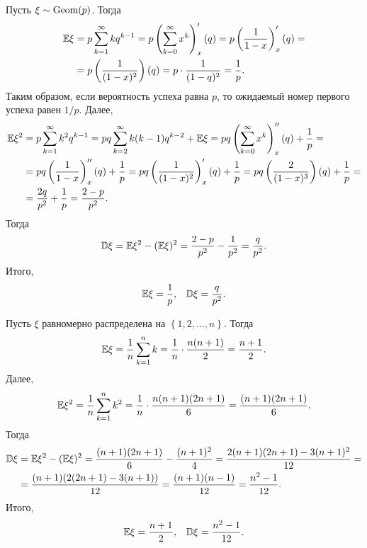 \documentclass[../main.tex]{subfiles}
\begin{document}
   \begin{exmpl}
    Пусть $ \xi\sim\mathrm{Geom}(p) $. Тогда
    \begin{align*}
     \mathbb E\xi &= p \sum_{k=1}^{\infty} k q^{k - 1} = p \left( \sum_{k=0}^{\infty} x^{k} \right)'_x(q) = p \left( \frac{1}{1-x} \right)'_x(q) = \\
     &= p \left( \frac{1}{(1-x)^{2}} \right)(q) = p \cdot \frac{1}{(1-q)^{2}} = \frac{1}{p}.
    \end{align*} Таким образом, если вероятность успеха равна $ p $, то ожидаемый номер первого успеха равен $ 1 / p $. Далее,
    \begin{align*}
     \mathbb E\xi^{2} &= p \sum_{k=1}^{\infty}k^{2}q^{k-1} = pq\sum_{k=2}^{\infty}k(k-1)q^{k-2} + \mathbb E\xi = pq \left( \sum_{k=0}^{\infty}x^{k} \right)''_x(q) + \frac{1}{p} = \\
     &= pq \left( \frac{1}{1-x} \right)''_x(q) + \frac{1}{p} = pq \left( \frac{1}{(1-x)^{2}} \right)'_x(q) + \frac{1}{p} = pq \left( \frac{2}{(1-x)^{3}} \right)(q)+\frac{1}{p} = \\
     &= \frac{2q}{p^{2}} + \frac{1}{p} = \frac{2 - p}{p^{2}}.
    \end{align*} Тогда
    \begin{align*}
     \mathbb D\xi = \mathbb E\xi^{2} - (\mathbb E\xi)^{2} = \frac{2-p}{p^{2}} - \frac{1}{p^{2}} = \frac{q}{p^{2}}.
    \end{align*} Итого,
    \begin{align*}
     \mathbb E\xi = \frac{1}{p}, && \mathbb D\xi = \frac{q}{p^{2}}.
    \end{align*}
   \end{exmpl}

   \begin{exmpl}
    Пусть $ \xi $ равномерно распределена на  $ \left\{ 1,2,\ldots,n \right\} $. Тогда
    \begin{align*}
     \mathbb E\xi = \frac{1}{n} \sum_{k=1}^{n} k = \frac{1}{n} \cdot \frac{n(n+1)}{2} = \frac{n+1}{2}.
    \end{align*} Далее,
    \begin{align*}
     \mathbb E\xi^{2} = \frac{1}{n} \sum_{k=1}^{n}k^{2} = \frac{1}{n}\cdot \frac{n(n+1)(2n+1)}{6} = \frac{(n+1)(2n+1)}{6}.
    \end{align*} Тогда
    \begin{align*}
     \mathbb D\xi &= \mathbb E\xi^{2} - (\mathbb E\xi)^{2} = \frac{(n+1)(2n+1)}{6} - \frac{(n+1)^{2}}{4} = \frac{2(n+1)(2n+1) - 3(n+1)^{2}}{12} = \\
     &= \frac{(n+1)(2(2n+1) - 3(n+1))}{12} = \frac{(n+1)(n-1)}{12} = \frac{n^{2}-1}{12}.
    \end{align*} Итого,
    \begin{align*}
     \mathbb E\xi = \frac{n+1}{2}, && \mathbb D\xi = \frac{n^{2}-1}{12}.
    \end{align*}
   \end{exmpl}
\end{document}
